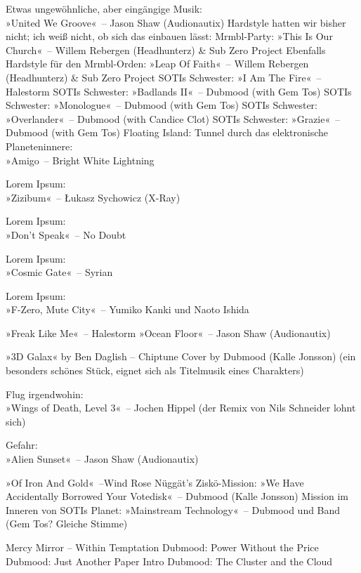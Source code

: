     Etwas ungewöhnliche, aber eingängige Musik:\\ »United We Groove«~– Jason Shaw (Audionautix)
    Hardstyle hatten wir bisher nicht; ich weiß nicht, ob sich das einbauen lässt: Mrmbl-Party: »This Is Our Church«~– Willem Rebergen (Headhunterz) \& Sub Zero Project
    Ebenfalls Hardstyle für den Mrmbl-Orden: »Leap Of Faith«~– Willem Rebergen (Headhunterz) \& Sub Zero Project
    SOTIs Schwester: »I Am The Fire«~– Halestorm
    SOTIs Schwester: »Badlands II«~– Dubmood (with Gem Tos)
    SOTIs Schwester: »Monologue«~– Dubmood (with Gem Tos)
    SOTIs Schwester: »Overlander«~– Dubmood (with Candice Clot)
    SOTIs Schwester: »Grazie«~– Dubmood (with Gem Tos)
    Floating Island: Tunnel durch das elektronische Planeteninnere:\\ »Amigo~– Bright White Lightning


   \item Lorem Ipsum:\\ »Zizibum«~– Łukasz Sychowicz (X-Ray)
   \item Lorem Ipsum:\\ »Don't Speak«~– No Doubt
   \item Lorem Ipsum:\\ »Cosmic Gate«~– Syrian
   \item Lorem Ipsum:\\ »F-Zero, Mute City«~– Yumiko Kanki und Naoto Ishida

»Freak Like Me«~– Halestorm »Ocean Floor«~– Jason Shaw (Audionautix)

   \item »3D Galax« by Ben Daglish – Chiptune Cover by Dubmood (Kalle Jonsson) (ein besonders schönes Stück, eignet sich als Titelmusik eines Charakters)


   \item Flug irgendwohin:\\ »Wings of Death, Level 3«~– Jochen Hippel (der Remix von Nils Schneider lohnt sich)
   \item Gefahr:\\ »Alien Sunset«~– Jason Shaw (Audionautix)


   »Of Iron And Gold«~–Wind Rose
   Nüggät's Ziskö-Mission: »We Have Accidentally Borrowed Your Votedisk«~– Dubmood (Kalle Jonsson)
   Mission im Inneren von SOTIs Planet: »Mainstream Technology«~– Dubmood und Band (Gem Tos? Gleiche Stimme)



Mercy Mirror – Within Temptation
Dubmood: Power Without the Price
Dubmood: Just Another Paper Intro
Dubmood: The Cluster and the Cloud


